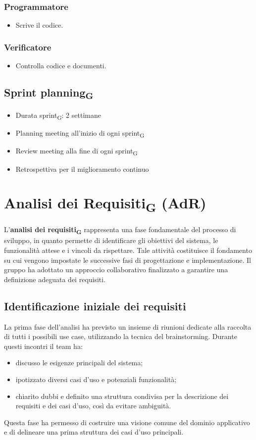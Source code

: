 \documentclass[11pt,a4paper]{article}
\newcommand{\gls}[1]{#1\textsubscript{G}}
\begin{document}
\subsubsection{Programmatore}
\begin{itemize}
    \item Scrive il codice.
\end{itemize}

\subsubsection{Verificatore}
\begin{itemize}
    \item Controlla codice e documenti.
\end{itemize}

\subsection{\gls{Sprint planning}}
\begin{itemize}
    \item Durata \gls{sprint}: 2 settimane
    \item Planning meeting all'inizio di ogni \gls{sprint}
    \item Review meeting alla fine di ogni \gls{sprint}
    \item Retrospettiva per il miglioramento continuo
\end{itemize}

\newpage

\section{\gls{Analisi dei Requisiti} (AdR)}
L’\textbf{\gls{analisi dei requisiti}} rappresenta una fase fondamentale del processo di sviluppo, in quanto permette di identificare gli obiettivi del sistema, le funzionalità attese e i vincoli da rispettare. Tale attività costituisce il fondamento su cui vengono impostate le successive fasi di progettazione e implementazione. 
Il gruppo ha adottato un approccio collaborativo finalizzato a garantire una definizione adeguata dei requisiti.

\subsection{Identificazione iniziale dei requisiti}
La prima fase dell’analisi ha previsto un insieme di riunioni dedicate alla raccolta di tutti i possibili use case, utilizzando la tecnica del brainstorming. Durante questi incontri il team ha:
\begin{itemize}
\item discusso le esigenze principali del sistema;
\item ipotizzato diversi casi d’uso e potenziali funzionalità;
\item chiarito dubbi e definito una struttura condivisa per la descrizione dei requisiti e dei casi d’uso, così da evitare ambiguità.
\end{itemize}
Questa fase ha permesso di costruire una visione comune del dominio applicativo e di delineare una prima struttura dei casi d’uso principali.
\end{document}
